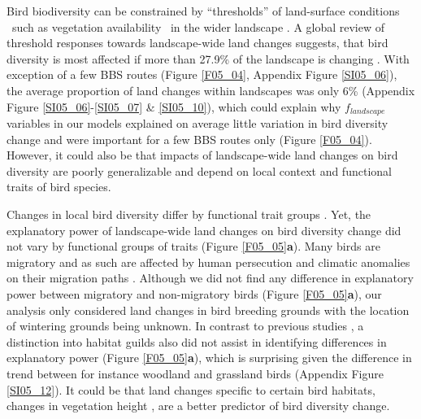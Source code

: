 Bird biodiversity can be constrained by “thresholds” of land-surface conditions \textendash\ such as vegetation availability \textendash\ in the wider landscape \citep{Andersen2009,Gutzwiller2015}. A global review of threshold responses towards landscape-wide land changes suggests, that bird diversity is most affected if more than 27.9\% of the landscape is changing \citep{Melo2018}. With exception of a few BBS routes (Figure \ref{F05_04}, Appendix Figure \ref{SI05_06}), the average proportion of land changes within landscapes was only 6\% (Appendix Figure \ref{SI05_06}-\ref{SI05_07} & \ref{SI05_10}), which could explain why $f_{landscape}$ variables in our models explained on average little variation in bird diversity change and were important for a few BBS routes only (Figure \ref{F05_04}). However, it could also be that impacts of landscape-wide land changes on bird diversity are poorly generalizable and depend on local context and functional traits of bird species. 

Changes in local bird diversity differ by functional trait groups \citep[Appendix Figure \ref{SI05_12},][]{Jarzyna2017,Barnagaud2017}. Yet, the explanatory power of landscape-wide land changes on bird diversity change did not vary by functional groups of traits (Figure \ref{F05_05}\textbf{a}). Many birds are migratory and as such are affected by human persecution and climatic anomalies on their migration paths \citep{Sanderson2006,Tottrup2012}. Although we did not find any difference in explanatory power between migratory and non-migratory birds (Figure \ref{F05_05}\textbf{a}), our analysis only considered land changes in bird breeding grounds with the location of wintering grounds being unknown. In contrast to previous studies \citep{Schipper2016}, a distinction into habitat guilds also did not assist in identifying differences in explanatory power (Figure \ref{F05_05}\textbf{a}), which is surprising given the difference in trend between for instance woodland and grassland birds (Appendix Figure \ref{SI05_12}). It could be that land changes specific to certain bird habitats, \eg changes in vegetation height \citep{Goetz2014}, are a better predictor of bird diversity change. 

